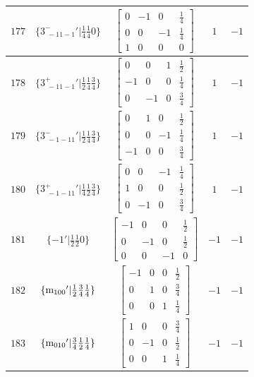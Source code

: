 \documentclass[fleqn,8pt]{jsarticle}
\begin{document}
\begin{longtable}{ccccc}
$ 177 $ & $ \{3^{-}_{\,\,-11-1}{}'|\frac{1}{4} \frac{1}{4} 0\} $ & $ \begin{bmatrix} 0 & -1 & 0 & \frac{1}{4} \\ 0 & 0 & -1 & \frac{1}{4} \\ 1 & 0 & 0 & 0 \end{bmatrix} $ & $ 1 $ & $ -1 $ \\ \hline
$ 178 $ & $ \{3^{+}_{\,\,-11-1}{}'|\frac{1}{2} \frac{1}{4} \frac{3}{4}\} $ & $ \begin{bmatrix} 0 & 0 & 1 & \frac{1}{2} \\ -1 & 0 & 0 & \frac{1}{4} \\ 0 & -1 & 0 & \frac{3}{4} \end{bmatrix} $ & $ 1 $ & $ -1 $ \\ \hline
$ 179 $ & $ \{3^{-}_{\,\,-1-11}{}'|\frac{1}{2} \frac{1}{4} \frac{3}{4}\} $ & $ \begin{bmatrix} 0 & 1 & 0 & \frac{1}{2} \\ 0 & 0 & -1 & \frac{1}{4} \\ -1 & 0 & 0 & \frac{3}{4} \end{bmatrix} $ & $ 1 $ & $ -1 $ \\ \hline
$ 180 $ & $ \{3^{+}_{\,\,-1-11}{}'|\frac{1}{4} \frac{1}{2} \frac{3}{4}\} $ & $ \begin{bmatrix} 0 & 0 & -1 & \frac{1}{4} \\ 1 & 0 & 0 & \frac{1}{2} \\ 0 & -1 & 0 & \frac{3}{4} \end{bmatrix} $ & $ 1 $ & $ -1 $ \\ \hline
$ 181 $ & $ \{-1{}'|\frac{1}{2} \frac{1}{2} 0\} $ & $ \begin{bmatrix} -1 & 0 & 0 & \frac{1}{2} \\ 0 & -1 & 0 & \frac{1}{2} \\ 0 & 0 & -1 & 0 \end{bmatrix} $ & $ -1 $ & $ -1 $ \\ \hline
$ 182 $ & $ \{{\rm m}_{100}{}'|\frac{1}{2} \frac{3}{4} \frac{1}{4}\} $ & $ \begin{bmatrix} -1 & 0 & 0 & \frac{1}{2} \\ 0 & 1 & 0 & \frac{3}{4} \\ 0 & 0 & 1 & \frac{1}{4} \end{bmatrix} $ & $ -1 $ & $ -1 $ \\ \hline
$ 183 $ & $ \{{\rm m}_{010}{}'|\frac{3}{4} \frac{1}{2} \frac{1}{4}\} $ & $ \begin{bmatrix} 1 & 0 & 0 & \frac{3}{4} \\ 0 & -1 & 0 & \frac{1}{2} \\ 0 & 0 & 1 & \frac{1}{4} \end{bmatrix} $ & $ -1 $ & $ -1 $ \\ \hline

\end{longtable}
\end{document}
